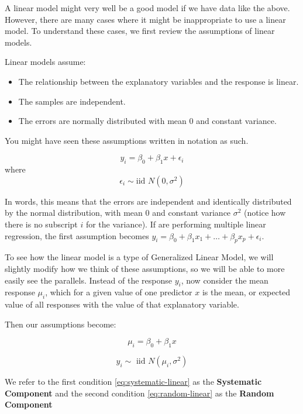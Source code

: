 \documentclass[
]{book}
\providecommand{\tightlist}{%
  \setlength{\itemsep}{0pt}\setlength{\parskip}{0pt}}
\begin{document}
A linear model might very well be a good model if we have data like the above. However, there are many cases where it might be inappropriate to use a linear model. To understand these cases, we first review the assumptions of linear models.

Linear models assume:

\begin{itemize}
\tightlist
\item
  The relationship between the explanatory variables and the response is linear.
\item
  The samples are independent.
\item
  The errors are normally distributed with mean 0 and constant variance.
\end{itemize}

You might have seen these assumptions written in notation as such.

\[y_i  = \beta_0 + \beta_1 x + \epsilon_i \]
where
\[ \epsilon_i \sim \text{iid } N(0,\sigma^2)\]

In words, this means that the errors are independent and identically distributed by the normal distribution, with mean 0 and constant variance \(\sigma^2\) (notice how there is no subscript \(i\) for the variance). If are performing multiple linear regression, the first assumption becomes \(y_i = \beta_0 + \beta_1 x_1 + \ldots + \beta_p x_p + \epsilon_i\).

To see how the linear model is a type of Generalized Linear Model, we will slightly modify how we think of these assumptions, so we will be able to more easily see the parallels. Instead of the response \(y_i\), now consider the mean response \(\mu_i\), which for a given value of one predictor \(x\) is the mean, or expected value of all responses with the value of that explanatory variable.

Then our assumptions become:

\begin{equation}
\mu_i = \beta_0 + \beta_1 x \label{eq:systematic-linear}
\end{equation}

\begin{equation}
y_i \sim \text{ iid } N(\mu_i, \sigma^2)\label{eq:random-linear}
\end{equation}

We refer to the first condition \eqref{eq:systematic-linear} as the \textbf{Systematic Component} and the second condition \eqref{eq:random-linear} as the \textbf{Random Component}
\end{document}
